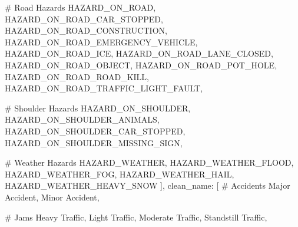 \documentclass[
  letterpaper,
  DIV=11,
  numbers=noendperiod]{scrartcl}
\newenvironment{Shaded}{\begin{snugshade}}{\end{snugshade}}
\newcommand{\CommentTok}[1]{\textcolor[rgb]{0.37,0.37,0.37}{#1}}
\newcommand{\NormalTok}[1]{\textcolor[rgb]{0.00,0.23,0.31}{#1}}
\newcommand{\StringTok}[1]{\textcolor[rgb]{0.13,0.47,0.30}{#1}}
\begin{document}
\begin{Shaded}
\begin{Highlighting}[]
        \CommentTok{\# Road Hazards}
        \StringTok{\textquotesingle{}HAZARD\_ON\_ROAD\textquotesingle{}}\NormalTok{,}
        \StringTok{\textquotesingle{}HAZARD\_ON\_ROAD\_CAR\_STOPPED\textquotesingle{}}\NormalTok{,}
        \StringTok{\textquotesingle{}HAZARD\_ON\_ROAD\_CONSTRUCTION\textquotesingle{}}\NormalTok{,}
        \StringTok{\textquotesingle{}HAZARD\_ON\_ROAD\_EMERGENCY\_VEHICLE\textquotesingle{}}\NormalTok{,}
        \StringTok{\textquotesingle{}HAZARD\_ON\_ROAD\_ICE\textquotesingle{}}\NormalTok{,}
        \StringTok{\textquotesingle{}HAZARD\_ON\_ROAD\_LANE\_CLOSED\textquotesingle{}}\NormalTok{,}
        \StringTok{\textquotesingle{}HAZARD\_ON\_ROAD\_OBJECT\textquotesingle{}}\NormalTok{,}
        \StringTok{\textquotesingle{}HAZARD\_ON\_ROAD\_POT\_HOLE\textquotesingle{}}\NormalTok{,}
        \StringTok{\textquotesingle{}HAZARD\_ON\_ROAD\_ROAD\_KILL\textquotesingle{}}\NormalTok{,}
        \StringTok{\textquotesingle{}HAZARD\_ON\_ROAD\_TRAFFIC\_LIGHT\_FAULT\textquotesingle{}}\NormalTok{,}
        
        \CommentTok{\# Shoulder Hazards}
        \StringTok{\textquotesingle{}HAZARD\_ON\_SHOULDER\textquotesingle{}}\NormalTok{,}
        \StringTok{\textquotesingle{}HAZARD\_ON\_SHOULDER\_ANIMALS\textquotesingle{}}\NormalTok{,}
        \StringTok{\textquotesingle{}HAZARD\_ON\_SHOULDER\_CAR\_STOPPED\textquotesingle{}}\NormalTok{,}
        \StringTok{\textquotesingle{}HAZARD\_ON\_SHOULDER\_MISSING\_SIGN\textquotesingle{}}\NormalTok{,}

                \CommentTok{\# Weather Hazards}
        \StringTok{\textquotesingle{}HAZARD\_WEATHER\textquotesingle{}}\NormalTok{,}
        \StringTok{\textquotesingle{}HAZARD\_WEATHER\_FLOOD\textquotesingle{}}\NormalTok{,}
        \StringTok{\textquotesingle{}HAZARD\_WEATHER\_FOG\textquotesingle{}}\NormalTok{,}
        \StringTok{\textquotesingle{}HAZARD\_WEATHER\_HAIL\textquotesingle{}}\NormalTok{,}
        \StringTok{\textquotesingle{}HAZARD\_WEATHER\_HEAVY\_SNOW\textquotesingle{}}
\NormalTok{    ],}
    \StringTok{\textquotesingle{}clean\_name\textquotesingle{}}\NormalTok{: [}
        \CommentTok{\# Accidents}
        \StringTok{\textquotesingle{}Major Accident\textquotesingle{}}\NormalTok{,}
        \StringTok{\textquotesingle{}Minor Accident\textquotesingle{}}\NormalTok{,}
        
        \CommentTok{\# Jams}
        \StringTok{\textquotesingle{}Heavy Traffic\textquotesingle{}}\NormalTok{,}
        \StringTok{\textquotesingle{}Light Traffic\textquotesingle{}}\NormalTok{,}
        \StringTok{\textquotesingle{}Moderate Traffic\textquotesingle{}}\NormalTok{,}
        \StringTok{\textquotesingle{}Standstill Traffic\textquotesingle{}}\NormalTok{,}
        

\end{Highlighting}
\end{Shaded}
\end{document}

